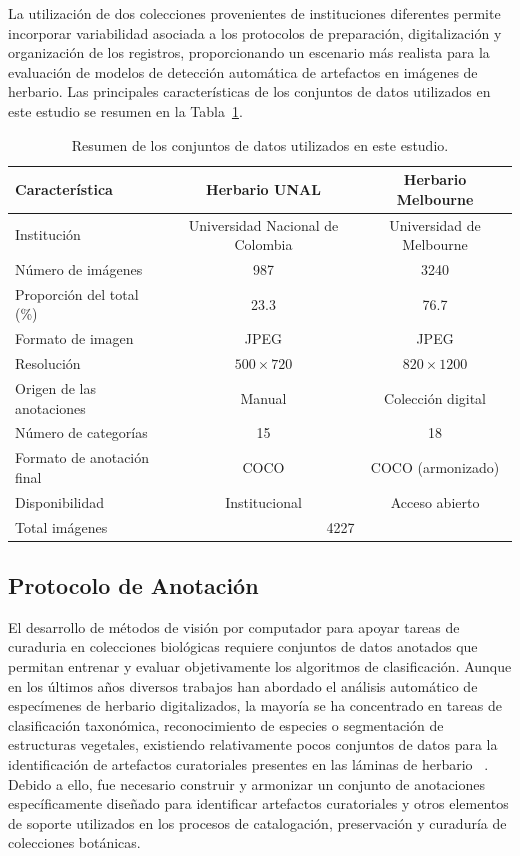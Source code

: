 La utilización de dos colecciones provenientes de instituciones diferentes permite incorporar variabilidad asociada a los protocolos de preparación, digitalización y organización de los registros, proporcionando un escenario más realista para la evaluación de modelos de detección automática de artefactos en imágenes de herbario. Las principales características de los conjuntos de datos utilizados en este estudio se resumen en la Tabla~\ref{tab:datasets}. 

\begin{table}[ht]
\centering
\begin{tabular}{lcc}
\hline
\textbf{Característica} & \textbf{Herbario UNAL} & \textbf{Herbario Melbourne} \\
\hline
Institución & Universidad Nacional de Colombia & Universidad de Melbourne \\
Número de imágenes & 987 & 3240 \\
Proporción del total (\%) & 23.3 & 76.7 \\
Formato de imagen & JPEG & JPEG \\
Resolución & $500 \times 720$ & $820 \times 1200$ \\
Origen de las anotaciones & Manual & Colección digital \\
Número de categorías & 15 & 18 \\
Formato de anotación final & COCO & COCO (armonizado) \\
Disponibilidad & Institucional & Acceso abierto \\
\hline
Total imágenes & \multicolumn{2}{c}{4227} \\
\hline
\end{tabular}
\caption{Resumen de los conjuntos de datos utilizados en este estudio.}
\label{tab:datasets}
\end{table}


\subsection*{Protocolo de Anotación}

El desarrollo de métodos de visión por computador para apoyar tareas de curaduria en colecciones biológicas requiere conjuntos de datos anotados que permitan entrenar y evaluar objetivamente los algoritmos de clasificación. Aunque en los últimos años diversos trabajos han abordado el análisis automático de especímenes de herbario digitalizados, la mayoría se ha concentrado en tareas de clasificación taxonómica, reconocimiento de especies o segmentación de estructuras vegetales, existiendo relativamente pocos conjuntos de datos para la identificación de artefactos curatoriales presentes en las láminas de herbario ~\citep{guo2025review}. Debido a ello, fue necesario construir y armonizar un conjunto de anotaciones específicamente diseñado para identificar artefactos curatoriales y otros elementos de soporte utilizados en los procesos de catalogación, preservación y curaduría de colecciones botánicas.


